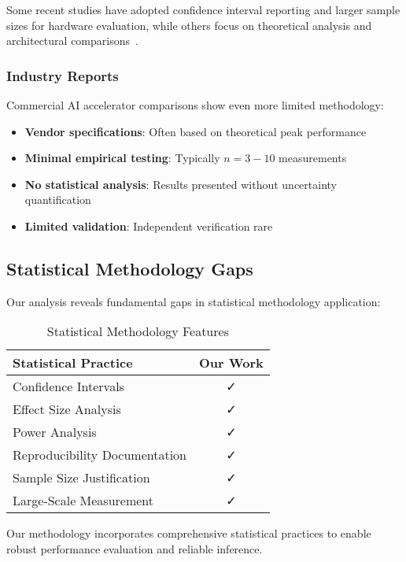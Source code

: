 \documentclass[manuscript]{acmart}
\begin{document}
Some recent studies have adopted confidence interval reporting and larger sample sizes for hardware evaluation, while others focus on theoretical analysis and architectural comparisons~\cite{cnn_acceleration2024,fpga_accelerators2024}.

\subsubsection{Industry Reports}
Commercial AI accelerator comparisons show even more limited methodology:

\begin{itemize}
    \item \textbf{Vendor specifications}: Often based on theoretical peak performance
    \item \textbf{Minimal empirical testing}: Typically $n = 3-10$ measurements
    \item \textbf{No statistical analysis}: Results presented without uncertainty quantification
    \item \textbf{Limited validation}: Independent verification rare
\end{itemize}

\subsection{Statistical Methodology Gaps}

Our analysis reveals fundamental gaps in statistical methodology application:

\begin{table}[h]
\centering
\caption{Statistical Methodology Features}
\begin{tabular}{@{}lc@{}}
\toprule
\textbf{Statistical Practice} & \textbf{Our Work} \\
\midrule
Confidence Intervals & ✓ \\
Effect Size Analysis & ✓ \\
Power Analysis & ✓ \\
Reproducibility Documentation & ✓ \\
Sample Size Justification & ✓ \\
Large-Scale Measurement & ✓ \\
\bottomrule
\end{tabular}
\end{table}

Our methodology incorporates comprehensive statistical practices to enable robust performance evaluation and reliable inference.
\end{document}
